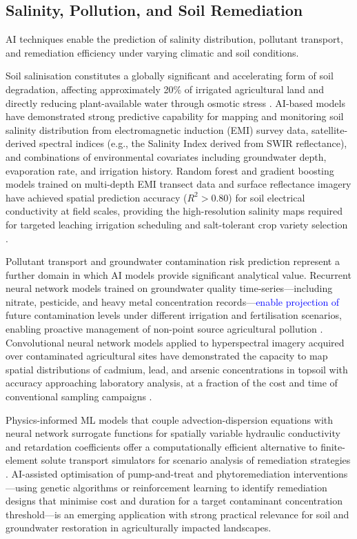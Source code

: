 \documentclass[land,article,submit,pdftex,moreauthors]{Definitions/mdpi}
\numberwithin{equation}{section}
\begin{document}
\subsection{Salinity, Pollution, and Soil Remediation}

AI techniques enable the prediction of salinity distribution, pollutant transport, and remediation efficiency under varying climatic and soil conditions.

Soil salinisation constitutes a globally significant and accelerating form of soil degradation, affecting approximately 20\% of irrigated agricultural land and directly reducing plant-available water through osmotic stress \citep{nachshon2018cropland}. AI-based models have demonstrated strong predictive capability for mapping and monitoring soil salinity distribution from electromagnetic induction (EMI) survey data, satellite-derived spectral indices (e.g., the Salinity Index derived from SWIR reflectance), and combinations of environmental covariates including groundwater depth, evaporation rate, and irrigation history. Random forest and gradient boosting models trained on multi-depth EMI transect data and surface reflectance imagery have achieved spatial prediction accuracy ($R^2 > 0.80$) for soil electrical conductivity at field scales, providing the high-resolution salinity maps required for targeted leaching irrigation scheduling and salt-tolerant crop variety selection \citep{Lemenkova202515}.

Pollutant transport and groundwater contamination risk prediction represent a further domain in which AI models provide significant analytical value. Recurrent neural network models trained on groundwater quality time-series---including nitrate, pesticide, and heavy metal concentration records---\textcolor{blue}{enable projection of} future contamination levels under different irrigation and fertilisation scenarios, enabling proactive management of non-point source agricultural pollution \citep{rahmati2019groundwater, Lemenkova202214, Lemenkova202233}. Convolutional neural network models applied to hyperspectral imagery acquired over contaminated agricultural sites have demonstrated the capacity to map spatial distributions of cadmium, lead, and arsenic concentrations in topsoil with accuracy approaching laboratory analysis, at a fraction of the cost and time of conventional sampling campaigns \textcolor{blue}{\citep{hong2021multimodal, Lemenkova202402}}. 

Physics-informed ML models that couple advection-dispersion equations with neural network surrogate functions for spatially variable hydraulic conductivity and retardation coefficients offer a computationally efficient alternative to finite-element solute transport simulators for scenario analysis of remediation strategies \textcolor{blue}{\citep{raissi2019physics, karniadakis2021physics, ghorbani2021physics}}. AI-assisted optimisation of pump-and-treat and phytoremediation interventions---using genetic algorithms or reinforcement learning to identify remediation designs that minimise cost and duration for a target contaminant concentration threshold---is an emerging application with strong practical relevance for soil and groundwater restoration in agriculturally impacted landscapes.
\end{document}
